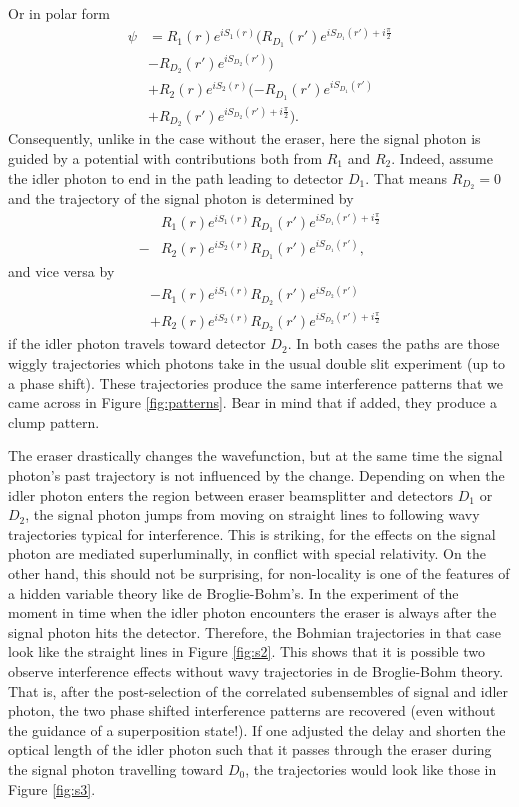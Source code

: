 \documentclass[12pt]{article}
\numberwithin{equation}{section}
\begin{document}
\noindent Or in polar form
\begin{align}
\label{bohmeraser}
\psi&= R_1(r)e^{iS_1(r)}(R_{D_1}(r')e^{iS_{D_1}(r')+i\frac{\pi}{2}}\\
&-R_{D_2}(r')e^{iS_{D_2}(r')})\nonumber \\
&+ R_2(r)e^{iS_2(r)}(-R_{D_1}(r')e^{iS_{D_1}(r')}\nonumber\\
&+R_{D_2}(r')e^{iS_{D_2}(r')+i\frac{\pi}{2}})\nonumber.
\end{align} Consequently, unlike in the case without the eraser, here the signal photon is guided by a potential with contributions both from $R_1$ and $R_2$. Indeed, assume the idler photon to end in the path leading to detector $D_1$. That means $R_{D_2}=0$ and the trajectory of the signal photon is determined by
\begin{align}
& R_1(r)e^{iS_1(r)}R_{D_1}(r')e^{iS_{D_1}(r')+i\frac{\pi}{2}} \nonumber \\
-& R_2(r)e^{iS_2(r)}R_{D_1}(r')e^{iS_{D_1}(r')},
\end{align} and vice versa by
\begin{align}
&- R_1(r)e^{iS_1(r)}R_{D_2}(r')e^{iS_{D_2}(r')} \nonumber
\\ &+R_2(r)e^{iS_2(r)}R_{D_2}(r')e^{iS_{D_2}(r')+i\frac{\pi}{2}}
\end{align} if the idler photon travels toward detector $D_2$. In both cases the paths are those wiggly trajectories  which photons take in the usual double slit experiment (up to a phase shift). These trajectories produce the same interference patterns that we came across in Figure \ref{fig:patterns}. Bear in mind that if added, they produce a clump pattern.    

The eraser drastically changes the wavefunction, but at the same time the signal photon's past trajectory is not influenced by the change. Depending on when the idler photon enters the region between eraser beamsplitter and detectors $D_1$ or $D_2$, the signal photon jumps from moving on straight lines to following wavy trajectories typical for interference. This is striking, for the effects on the signal photon are mediated superluminally, in conflict with special relativity. On the other hand, this should not be surprising, for non-locality is one of the features of a hidden variable theory like de Broglie-Bohm's. In the experiment of \cite{Kim1999} the moment in time when the idler photon encounters the eraser is always after the signal photon hits the detector. Therefore, the Bohmian trajectories in that case look like the straight lines in Figure \ref{fig:s2}. This shows that it is possible two observe interference effects without wavy trajectories in de Broglie-Bohm theory. That is, after the post-selection of the correlated subensembles of signal and idler photon, the two phase shifted interference patterns are recovered (even without the guidance of a superposition state!). If one adjusted the delay and shorten the optical length of the idler photon such that it passes through the eraser during the signal photon travelling toward $D_0$, the trajectories would look like those in Figure \ref{fig:s3}.
\end{document}
